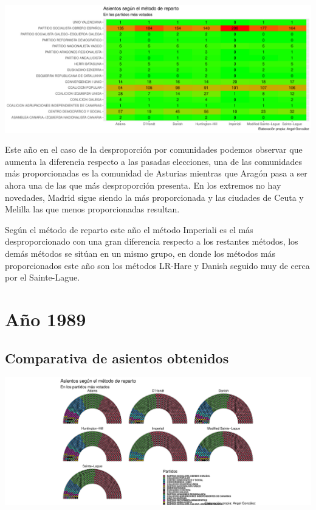 \documentclass[12pt,a4paper,]{book}
\numberwithin{dummy}{section}
\theoremstyle{ocrenumbox}
\theoremstyle{blacknumex}
\theoremstyle{blacknumbox}
\theoremstyle{ocrenum}
\theoremstyle{ocrenum}
\begin{document}
\begin{center}\includegraphics[width=1\linewidth]{figurasR/unnamed-chunk-86-2} \end{center}

Este año en el caso de la desproporción por comunidades podemos observar
que aumenta la diferencia respecto a las pasadas elecciones, una de las
comunidades más proporcionadas es la comunidad de Asturias mientras que
Aragón pasa a ser ahora una de las que más desproporción presenta. En
los extremos no hay novedades, Madrid sigue siendo la más proporcionada
y las ciudades de Ceuta y Melilla las que menos proporcionadas resultan.

Según el método de reparto este año el método Imperiali es el más
desproporcionado con una gran diferencia respecto a los restantes
métodos, los demás métodos se sitúan en un mismo grupo, en donde los
métodos más proporcionados este año son los métodos LR-Hare y Danish
seguido muy de cerca por el Sainte-Lague.

\hypertarget{auxf1o-1989}{%
\section{Año 1989}\label{auxf1o-1989}}

\hypertarget{comparativa-de-asientos-obtenidos-4}{%
\subsection{Comparativa de asientos
obtenidos}\label{comparativa-de-asientos-obtenidos-4}}

\begin{center}\includegraphics[width=1\linewidth]{figurasR/unnamed-chunk-88-1} \end{center}
\end{document}

